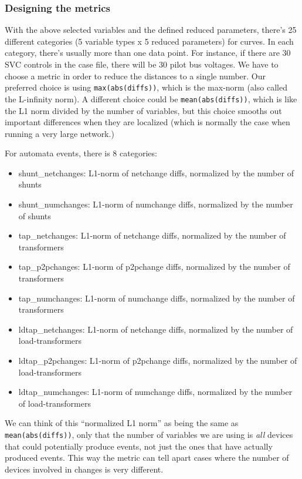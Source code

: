 \documentclass[conference]{IEEEtran}
\newcommand{\code}[1]{\texttt{#1}}
\begin{document}
\subsubsection{Designing the metrics}
With the above selected variables and the defined reduced parameters,
there's 25 different categories (5 variable types x 5 reduced
parameters) for curves. In each category, there's usually more than
one data point. For instance, if there are 30 SVC controls in the case
file, there will be 30 pilot bus voltages. We have to choose a metric
in order to reduce the distances to a single number. Our preferred
choice is using \code{max(abs(diffs))}, which is the max-norm (also
called the L-infinity norm).  A different choice could be
\code{mean(abs(diffs))}, which is like the L1 norm divided by the
number of variables, but this choice smooths out important differences
when they are localized (which is normally the case when running a
very large network.)

For automata events, there is 8 categories:
\begin{itemize}
\item shunt\_netchanges: L1-norm of netchange diffs, normalized by the number of shunts
\item shunt\_numchanges: L1-norm of numchange diffs, normalized by the number of shunts
\item tap\_netchanges: L1-norm of netchange diffs, normalized by the number of transformers
\item tap\_p2pchanges: L1-norm of p2pchange diffs, normalized by the number of transformers
\item tap\_numchanges:  L1-norm of numchange diffs, normalized by the number of transformers
\item ldtap\_netchanges:  L1-norm of netchange diffs, normalized by the number of load-transformers
\item ldtap\_p2pchanges: L1-norm of p2pchange diffs, normalized by the number of load-transformers
\item ldtap\_numchanges: L1-norm of numchange diffs, normalized by the number of load-transformers
\end{itemize}  

We can think of this ``normalized L1 norm'' as being the same as
\code{mean(abs(diffs))}, only that the number of variables we are
using is \emph{all} devices that could potentially produce events, not
just the ones that have actually produced events. This way the metric
can tell apart cases where the number of devices involved in changes
is very different.
\end{document}
